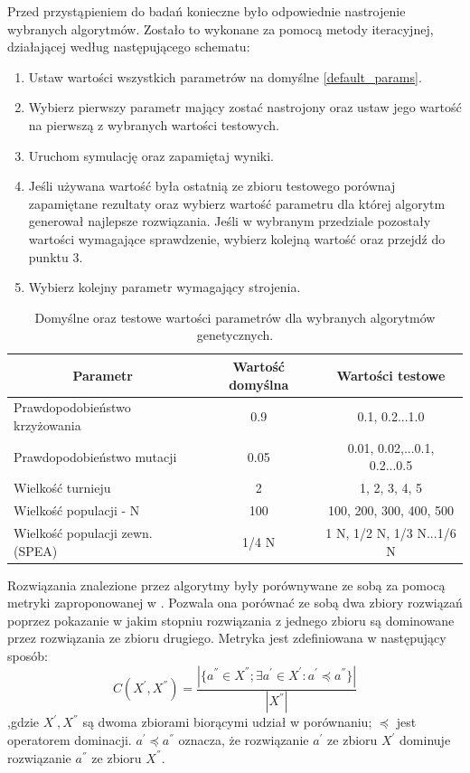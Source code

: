 \documentclass[twoside]{iisthesis}
\begin{document}
Przed przystąpieniem do badań konieczne było odpowiednie nastrojenie wybranych algorytmów. Zostało to wykonane za pomocą metody iteracyjnej, działającej według następującego schematu:\\
\begin{enumerate}
	\item Ustaw wartości wszystkich parametrów na domyślne \eqref{default_params}.
	\item Wybierz pierwszy parametr mający zostać nastrojony oraz ustaw jego wartość na pierwszą z wybranych wartości testowych.
	\item Uruchom symulację oraz zapamiętaj wyniki.
	\item Jeśli używana wartość była ostatnią ze zbioru testowego porównaj zapamiętane rezultaty oraz wybierz wartość parametru dla której algorytm generował najlepsze rozwiązania. Jeśli w wybranym przedziale pozostały wartości wymagające sprawdzenie, wybierz kolejną wartość oraz przejdź do punktu 3.
	\item Wybierz kolejny parametr wymagający strojenia.\\
\end{enumerate}
\begin{table}[H]
\centering
\begin{tabular}{|l|c|c|}
\hline
\multicolumn{1}{|c|}{\textbf{Parametr}} & \textbf{Wartość domyślna} & \textbf{Wartości testowe}                    \\ \hline
Prawdopodobieństwo krzyżowania          & 0.9                       & 0.1, 0.2...1.0                             \\ \hline
Prawdopodobieństwo mutacji              & 0.05                      & 0.01, 0.02,...0.1, 0.2...0.5 \\ \hline
Wielkość turnieju                       & 2                         & 1, 2, 3, 4, 5                                    \\ \hline
Wielkość populacji - N                  & 100                       & 100, 200, 300, 400, 500                      \\ \hline
Wielkość populacji zewn. (SPEA)         & 1/4 N                     & 1 N, 1/2 N, 1/3 N...1/6 N                  \\ \hline
\end{tabular}
\caption{Domyślne oraz testowe wartości parametrów dla wybranych algorytmów genetycznych.}
\label{default_params}
\end{table}
Rozwiązania znalezione przez algorytmy były porównywane ze sobą za pomocą metryki zaproponowanej w \cite{tuning}. Pozwala ona porównać ze sobą dwa zbiory rozwiązań poprzez pokazanie w jakim stopniu rozwiązania z jednego zbioru są dominowane przez rozwiązania ze zbioru drugiego. Metryka jest zdefiniowana w następujący sposób:
\begin{equation}
	C(X^{'}, X^{''}) = \dfrac{|\{a^{''} \in X^{''}; \exists a^{'} \in X^{'}: a^{'} \preceq a^{''}\}|}{|X^{''}|}
\end{equation}
,gdzie $X^{'}, X^{''}$ są dwoma zbiorami biorącymi udział w porównaniu; $\preceq$ jest operatorem dominacji. $a^{'} \preceq a^{''}$ oznacza, że rozwiązanie $a^{'}$ ze zbioru $X^{'}$ dominuje rozwiązanie $a^{''}$ ze zbioru $X^{''}$.\\
\end{document}

